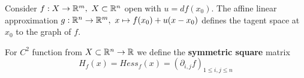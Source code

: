 \begin{definition}
	Consider $f: X \to \mathbb{R}^m, \ X\subset \mathbb{R}^n$ open with $u=df(x_0)$.
	The affine linear approximation $g: \mathbb{R}^n \to \mathbb{R}^m,\  x \mapsto f(x_0) + u(x-x_0)$ defines the tagent space at $x_0$ to the graph of $f$.
\end{definition}

\begin{definition}
	For $C^2$ function from $X\subset \mathbb{R}^n \to \mathbb{R}$ we define the \textbf{symmetric square} matrix
	$$H_f(x) = Hess_f(x) = (\partial_{i, j} f)_{1 \leq i, j \leq n}$$
\end{definition}


